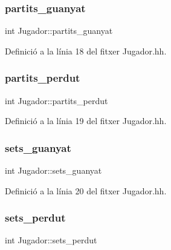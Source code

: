 \subsubsection{\texorpdfstring{partits\+\_\+guanyat}{partits\_guanyat}}
{\footnotesize\ttfamily int Jugador\+::partits\+\_\+guanyat\hspace{0.3cm}{\ttfamily [private]}}



Definició a la línia 18 del fitxer Jugador.\+hh.

\mbox{\label{class_jugador_ad1e6a56bea30a1449dbb37871c288fcf}} 
\subsubsection{\texorpdfstring{partits\+\_\+perdut}{partits\_perdut}}
{\footnotesize\ttfamily int Jugador\+::partits\+\_\+perdut\hspace{0.3cm}{\ttfamily [private]}}



Definició a la línia 19 del fitxer Jugador.\+hh.

\mbox{\label{class_jugador_a396b226c722425d387f36e239fc9855c}} 
\subsubsection{\texorpdfstring{sets\+\_\+guanyat}{sets\_guanyat}}
{\footnotesize\ttfamily int Jugador\+::sets\+\_\+guanyat\hspace{0.3cm}{\ttfamily [private]}}



Definició a la línia 20 del fitxer Jugador.\+hh.

\mbox{\label{class_jugador_a7c9fcb3ec52c2c400e7cf8faaf945426}} 
\subsubsection{\texorpdfstring{sets\+\_\+perdut}{sets\_perdut}}
{\footnotesize\ttfamily int Jugador\+::sets\+\_\+perdut\hspace{0.3cm}{\ttfamily [private]}}



